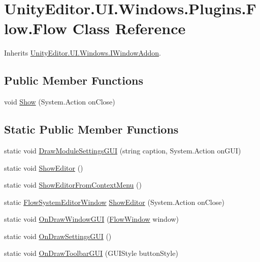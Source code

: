 \hypertarget{class_unity_editor_1_1_u_i_1_1_windows_1_1_plugins_1_1_flow_1_1_flow}{}\section{Unity\+Editor.\+U\+I.\+Windows.\+Plugins.\+Flow.\+Flow Class Reference}
\label{class_unity_editor_1_1_u_i_1_1_windows_1_1_plugins_1_1_flow_1_1_flow}


Inherits \hyperlink{interface_unity_editor_1_1_u_i_1_1_windows_1_1_i_window_addon}{Unity\+Editor.\+U\+I.\+Windows.\+I\+Window\+Addon}.

\subsection*{Public Member Functions}
\begin{DoxyCompactItemize}
\item 
void \hyperlink{class_unity_editor_1_1_u_i_1_1_windows_1_1_plugins_1_1_flow_1_1_flow_a16d4bfb0b617138cc4a16ea51b798e1f}{Show} (System.\+Action on\+Close)
\end{DoxyCompactItemize}
\subsection*{Static Public Member Functions}
\begin{DoxyCompactItemize}
\item 
static void \hyperlink{class_unity_editor_1_1_u_i_1_1_windows_1_1_plugins_1_1_flow_1_1_flow_a83ce644cc525f313b5529b3825b9ddbd}{Draw\+Module\+Settings\+G\+U\+I} (string caption, System.\+Action on\+G\+U\+I)
\item 
static void \hyperlink{class_unity_editor_1_1_u_i_1_1_windows_1_1_plugins_1_1_flow_1_1_flow_a1161140ad9892777f163ffe44574b65e}{Show\+Editor} ()
\item 
static void \hyperlink{class_unity_editor_1_1_u_i_1_1_windows_1_1_plugins_1_1_flow_1_1_flow_ad607a959e0720a318c731be8f3764b85}{Show\+Editor\+From\+Context\+Menu} ()
\item 
static \hyperlink{class_unity_editor_1_1_u_i_1_1_windows_1_1_plugins_1_1_flow_1_1_flow_system_editor_window}{Flow\+System\+Editor\+Window} \hyperlink{class_unity_editor_1_1_u_i_1_1_windows_1_1_plugins_1_1_flow_1_1_flow_abc5b0d96762e313e5530acd8330da188}{Show\+Editor} (System.\+Action on\+Close)
\item 
static void \hyperlink{class_unity_editor_1_1_u_i_1_1_windows_1_1_plugins_1_1_flow_1_1_flow_aabd27bca058da94735924297ff752a48}{On\+Draw\+Window\+G\+U\+I} (\hyperlink{class_unity_engine_1_1_u_i_1_1_windows_1_1_plugins_1_1_flow_1_1_flow_window}{Flow\+Window} window)
\item 
static void \hyperlink{class_unity_editor_1_1_u_i_1_1_windows_1_1_plugins_1_1_flow_1_1_flow_a58e09d0bb607fb82165cac643d832077}{On\+Draw\+Settings\+G\+U\+I} ()
\item 
static void \hyperlink{class_unity_editor_1_1_u_i_1_1_windows_1_1_plugins_1_1_flow_1_1_flow_a7d73e66aedb50109cac58a2fc12296be}{On\+Draw\+Toolbar\+G\+U\+I} (G\+U\+I\+Style button\+Style)
\end{DoxyCompactItemize}


